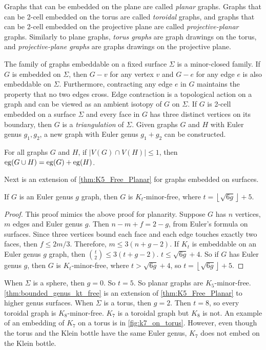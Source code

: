 Graphs that can be embedded on the plane are called \textit{planar} graphs. Graphs that can be 2-cell embedded on the torus are called \textit{toroidal} graphs, and graphs that can be 2-cell embedded on the projective plane are called \textit{projective-planar} graphs. Similarly to plane graphs, \textit{torus graphs} are graph drawings on the torus, and \textit{projective-plane graphs} are graphs drawings on the projective plane. 

The family of graphs embeddable on a fixed surface $\Sigma$ is a minor-closed family. If $G$ is embedded on $\Sigma$, then $G - v$ for any vertex $v$ and $G - e$ for any edge $e$ is also embeddable on $\Sigma$. Furthermore, contracting any edge $e$ in $G$ maintains the property that no two edges cross. Edge contraction is a topological action on a graph and can be viewed as an ambient isotopy of $G$ on $\Sigma$. 
If $G$ is 2-cell embedded on a surface $\Sigma$ and every face in $G$ has three distinct vertices on its boundary, then $G$ is a \textit{triangulation} of $\Sigma$. Given graphs $G$ and $H$ with Euler genus $g_1, g_2$, a new graph with Euler genus $g_1 + g_2$ can be constructed.
\begin{theorem}\label{thm:additivity_genus}
	For all graphs $G$ and $H$, if $|V(G) \cap V(H)| \leq 1$, then $\operatorname{eg}(G \cup H) = \operatorname{eg}(G) + \operatorname{eg}(H)$. 
\end{theorem}

Next is an extension of \cref{thm:K5_Free_Planar} for graphs embedded on surfaces. 

\begin{theorem}\label{thm:bounded_genus_kt_free}
	If \(G\) is an Euler genus \(g\) graph, then \(G\) is \(K_t\)-minor-free, where \(t = \left\lfloor \sqrt{6g} \right\rfloor + 5\). 
\end{theorem}
\begin{proof}
	This proof mimics the above proof for planarity.
	Suppose \(G\) has \(n\) vertices, \(m\) edges and Euler genus $g$. Then \(n - m + f = 2-g\), from Euler's formula on surfaces. Since three vertices bound each face and each edge touches exactly two faces, then \(f \leq 2m/3\). Therefore, \(m \leq 3(n + g - 2)\). If \(K_t\) is embeddable on an Euler genus \(g\) graph, then \(\binom{t}{2} \leq 3 (t + g - 2)\). \(t \leq \sqrt{6g} + 4\). So if $G$ has Euler genus \(g\), then $G$ is \(K_t\)-minor-free, where \(t > \sqrt{6g} + 4\), so \(t = \left\lfloor \sqrt{6g} \right\rfloor + 5\). 
\end{proof}
When $\Sigma$ is a sphere, then $g = 0$. So $t = 5$. So planar graphs are $K_5$-minor-free. \cref{thm:bounded_genus_kt_free} is an extension of \cref{thm:K5_Free_Planar} to higher genus surfaces. 
When $\Sigma$ is a torus, then $g = 2$. Then $t = 8$, so every toroidal graph is $K_8$-minor-free. $K_7$ is a toroidal graph but $K_8$ is not. An example of an embedding of $K_7$ on a torus is in \cref{fig:k7_on_torus}. However, even though the torus and the Klein bottle have the same Euler genus, $K_7$ does not embed on the Klein bottle. 


